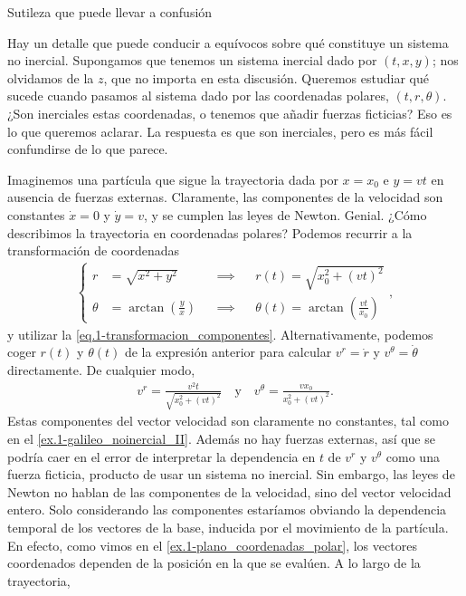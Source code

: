 \begin{observation}
    {Sutileza que puede llevar a confusión}
    \label{obs.1-galileo_noinercial}

    Hay un detalle que puede conducir a equívocos sobre qué constituye un sistema no inercial. Supongamos que tenemos un sistema inercial dado por \((t, x, y)\); nos olvidamos de la \(z\), que no importa en esta discusión. Queremos estudiar qué sucede cuando pasamos al sistema dado por las coordenadas polares, \((t, r, \theta)\). ¿Son inerciales estas coordenadas, o tenemos que añadir fuerzas ficticias? Eso es lo que queremos aclarar. La respuesta es que son inerciales, pero es más fácil confundirse de lo que parece. 

    Imaginemos una partícula que sigue la trayectoria dada por \(x = x_0\) e \(y = vt\) en ausencia de fuerzas externas. Claramente, las componentes de la velocidad son constantes \(\dot{x} = 0\) y \(\dot{y} = v\), y se cumplen las leyes de Newton. Genial. ¿Cómo describimos la trayectoria en coordenadas polares? Podemos recurrir a la transformación de coordenadas 
    \begin{align}
        \left\{
        \begin{aligned}
            r &= \sqrt{x^2 + y^2} &&\implies && r(t) = \sqrt{x_0^2 + (vt)^2}\\
            \theta &= \arctan\left(\frac{y}{x}\right) &&\implies && \theta(t) = \arctan\left(\frac{vt}{x_0}\right)
        \end{aligned}\right.,
    \end{align}
    y utilizar la \cref{eq.1-transformacion_componentes}. Alternativamente, podemos coger \(r(t)\) y \(\theta(t)\) de la expresión anterior para calcular \(v^r=\dot{r}\) y \(v^\theta = \dot{\theta}\) directamente. De cualquier modo,
    \begin{align}
        v^r = \frac{v^2t}{\sqrt{x_0^2 + (vt)^2}}
        \quad\text{y}\quad
        v^{\theta} = \frac{v x_0}{x_0^2 + (vt)^2}.
    \end{align}
    Estas componentes del vector velocidad son claramente no constantes, tal como en el \cref{ex.1-galileo_noinercial_II}. Además no hay fuerzas externas, así que se podría caer en el error de interpretar la dependencia en \(t\) de \(v^{r}\) y \(v^{\theta}\) como una fuerza ficticia, producto de usar un sistema no inercial. Sin embargo, las leyes de Newton no hablan de las componentes de la velocidad, sino del vector velocidad entero. Solo considerando las componentes estaríamos obviando la dependencia temporal de los vectores de la base, inducida por el movimiento de la partícula. En efecto, como vimos en el \cref{ex.1-plano_coordenadas_polar}, los vectores coordenados dependen de la posición en la que se evalúen. A lo largo de la trayectoria,

\end{observation}
